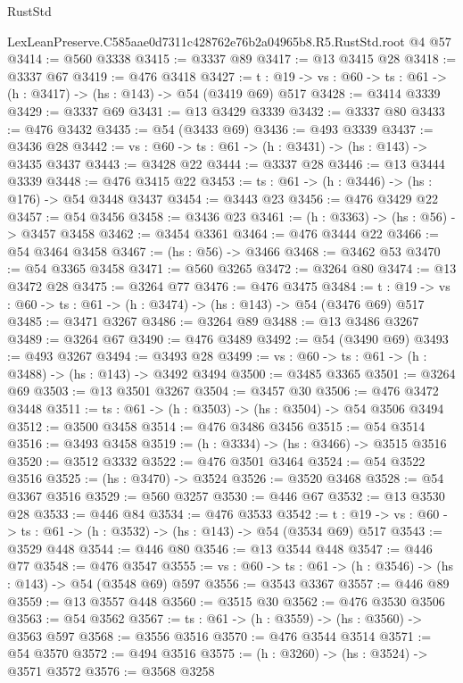 \begin{lexlean}{RustStd}
\begin{coremodule}
  LexLeanPreserve.C585aae0d7311c428762e76b2a04965b8.R5.RustStd.root @4 @57
@3414 := @560 @3338
@3415 := @3337 @89
@3417 := @13 @3415 @28
@3418 := @3337 @67
@3419 := @476 @3418
@3427 := {t : @19} -> {vs : @60} -> {ts : @61} -> (h : @3417) -> (hs : @143) -> @54 (@3419 @69) @517
@3428 := @3414 @3339
@3429 := @3337 @69
@3431 := @13 @3429 @3339
@3432 := @3337 @80
@3433 := @476 @3432
@3435 := @54 (@3433 @69)
@3436 := @493 @3339
@3437 := @3436 @28
@3442 := {vs : @60} -> {ts : @61} -> (h : @3431) -> (hs : @143) -> @3435 @3437
@3443 := @3428 @22
@3444 := @3337 @28
@3446 := @13 @3444 @3339
@3448 := @476 @3415 @22
@3453 := {ts : @61} -> (h : @3446) -> (hs : @176) -> @54 @3448 @3437
@3454 := @3443 @23
@3456 := @476 @3429 @22
@3457 := @54 @3456
@3458 := @3436 @23
@3461 := (h : @3363) -> (hs : @56) -> @3457 @3458
@3462 := @3454 @3361
@3464 := @476 @3444 @22
@3466 := @54 @3464 @3458
@3467 := (hs : @56) -> @3466
@3468 := @3462 @53
@3470 := @54 @3365 @3458
@3471 := @560 @3265
@3472 := @3264 @80
@3474 := @13 @3472 @28
@3475 := @3264 @77
@3476 := @476 @3475
@3484 := {t : @19} -> {vs : @60} -> {ts : @61} -> (h : @3474) -> (hs : @143) -> @54 (@3476 @69) @517
@3485 := @3471 @3267
@3486 := @3264 @89
@3488 := @13 @3486 @3267
@3489 := @3264 @67
@3490 := @476 @3489
@3492 := @54 (@3490 @69)
@3493 := @493 @3267
@3494 := @3493 @28
@3499 := {vs : @60} -> {ts : @61} -> (h : @3488) -> (hs : @143) -> @3492 @3494
@3500 := @3485 @3365
@3501 := @3264 @69
@3503 := @13 @3501 @3267
@3504 := @3457 @30
@3506 := @476 @3472 @3448
@3511 := {ts : @61} -> (h : @3503) -> (hs : @3504) -> @54 @3506 @3494
@3512 := @3500 @3458
@3514 := @476 @3486 @3456
@3515 := @54 @3514
@3516 := @3493 @3458
@3519 := (h : @3334) -> (hs : @3466) -> @3515 @3516
@3520 := @3512 @3332
@3522 := @476 @3501 @3464
@3524 := @54 @3522 @3516
@3525 := (hs : @3470) -> @3524
@3526 := @3520 @3468
@3528 := @54 @3367 @3516
@3529 := @560 @3257
@3530 := @446 @67
@3532 := @13 @3530 @28
@3533 := @446 @84
@3534 := @476 @3533
@3542 := {t : @19} -> {vs : @60} -> {ts : @61} -> (h : @3532) -> (hs : @143) -> @54 (@3534 @69) @517
@3543 := @3529 @448
@3544 := @446 @80
@3546 := @13 @3544 @448
@3547 := @446 @77
@3548 := @476 @3547
@3555 := {vs : @60} -> {ts : @61} -> (h : @3546) -> (hs : @143) -> @54 (@3548 @69) @597
@3556 := @3543 @3367
@3557 := @446 @89
@3559 := @13 @3557 @448
@3560 := @3515 @30
@3562 := @476 @3530 @3506
@3563 := @54 @3562
@3567 := {ts : @61} -> (h : @3559) -> (hs : @3560) -> @3563 @597
@3568 := @3556 @3516
@3570 := @476 @3544 @3514
@3571 := @54 @3570
@3572 := @494 @3516
@3575 := (h : @3260) -> (hs : @3524) -> @3571 @3572
@3576 := @3568 @3258

\end{coremodule}
\end{lexlean}
